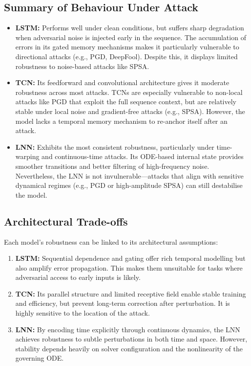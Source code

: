 \subsection{Summary of Behaviour Under Attack}

\begin{itemize}
    \item \textbf{LSTM:} Performs well under clean conditions, but suffers sharp degradation when adversarial noise is injected early in the sequence. The accumulation of errors in its gated memory mechanisms makes it particularly vulnerable to directional attacks (e.g., PGD, DeepFool). Despite this, it displays limited robustness to noise-based attacks like SPSA.
    
    \item \textbf{TCN:} Its feedforward and convolutional architecture gives it moderate robustness across most attacks. TCNs are especially vulnerable to non-local attacks like PGD that exploit the full sequence context, but are relatively stable under local noise and gradient-free attacks (e.g., SPSA). However, the model lacks a temporal memory mechanism to re-anchor itself after an attack.

    \item \textbf{LNN:} Exhibits the most consistent robustness, particularly under time-warping and continuous-time attacks. Its ODE-based internal state provides smoother transitions and better filtering of high-frequency noise. Nevertheless, the LNN is not invulnerable—attacks that align with sensitive dynamical regimes (e.g., PGD or high-amplitude SPSA) can still destabilise the model.
\end{itemize}

\subsection{Architectural Trade-offs}

Each model's robustness can be linked to its architectural assumptions:
\begin{enumerate}
    \item \textbf{LSTM:} Sequential dependence and gating offer rich temporal modelling but also amplify error propagation. This makes them unsuitable for tasks where adversarial access to early inputs is likely.
    \item \textbf{TCN:} Its parallel structure and limited receptive field enable stable training and efficiency, but prevent long-term correction after perturbation. It is highly sensitive to the location of the attack.
    \item \textbf{LNN:} By encoding time explicitly through continuous dynamics, the LNN achieves robustness to subtle perturbations in both time and space. However, stability depends heavily on solver configuration and the nonlinearity of the governing ODE.
\end{enumerate}

